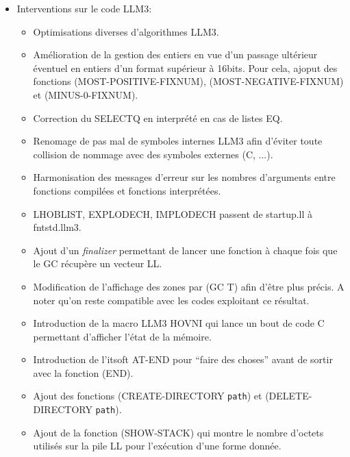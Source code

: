 \begin {itemize}
\begin {itemize}
\end {itemize}

\item Interventions sur le code LLM3:

\begin{itemize}

\item Optimisations diverses d'algorithmes LLM3.

\item Am\'{e}lioration de la gestion des entiers en vue d'un passage
ult\'{e}rieur \'{e}ventuel en entiers d'un format sup\'{e}rieur \`{a} 16bits.
Pour cela, ajoput des fonctions (MOST-POSITIVE-FIXNUM),
(MOST-NEGATIVE-FIXNUM) et (MINUS-0-FIXNUM).

\item Correction du SELECTQ en interpr\'{e}t\'{e} en cas de listes EQ.

\item Renomage de pas mal de symboles internes LLM3 afin d'\'{e}viter
toute collision de nommage avec des symboles externes (C, ...).

\item Harmonisation des messages d'erreur sur les nombres d'arguments
entre fonctions compil\'{e}es et fonctions interpr\'{e}t\'{e}es.

\item LHOBLIST, EXPLODECH, IMPLODECH passent de startup.ll \`{a}
fntstd.llm3. 

\item Ajout d'un {\it finalizer} permettant de lancer une fonction \`{a}
chaque fois que le GC r\'{e}cup\`{e}re un vecteur LL.

\item Modification de l'affichage des zones par  (GC T) afin d'\^{e}tre
plus pr\'{e}cis. A noter qu'on reste compatible avec les codes exploitant
ce r\'{e}sultat.

\item Introduction de la macro LLM3 HOVNI qui lance un bout de code C
permettant d'afficher l'\'{e}tat de la m\'{e}moire.

\item Introduction de l'itsoft AT-END pour ``faire des choses{''} avant
de sortir avec la fonction (END).

\item Ajout des fonctions (CREATE-DIRECTORY {\tt path}) et
(DELETE-DIRECTORY {\tt path}).

\item Ajout de la fonction (SHOW-STACK) qui montre le nombre d'octets
utilis\'{e}s sur la pile LL pour l'ex\'{e}cution d'une forme donn\'{e}e.


\end{itemize}
\end{itemize}
